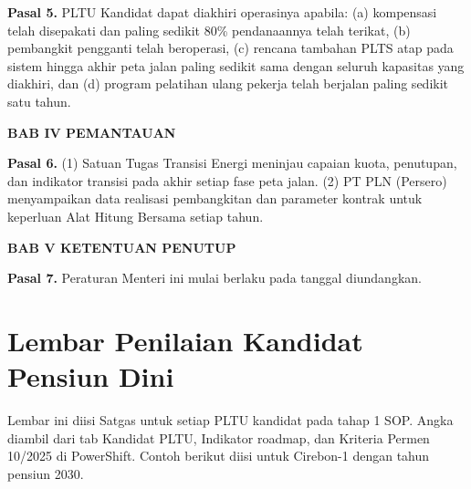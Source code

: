 \noindent\textbf{Pasal 5.} PLTU Kandidat dapat diakhiri operasinya apabila: (a) kompensasi telah disepakati dan paling sedikit 80\% pendanaannya telah terikat, (b) pembangkit pengganti telah beroperasi, (c) rencana tambahan PLTS atap pada sistem hingga akhir peta jalan paling sedikit sama dengan seluruh kapasitas yang diakhiri, dan (d) program pelatihan ulang pekerja telah berjalan paling sedikit satu tahun.

\begin{center}\textbf{BAB IV PEMANTAUAN}\end{center}
\noindent\textbf{Pasal 6.} (1) Satuan Tugas Transisi Energi meninjau capaian kuota, penutupan, dan indikator transisi pada akhir setiap fase peta jalan. (2) PT PLN (Persero) menyampaikan data realisasi pembangkitan dan parameter kontrak untuk keperluan Alat Hitung Bersama setiap tahun.

\begin{center}\textbf{BAB V KETENTUAN PENUTUP}\end{center}
\noindent\textbf{Pasal 7.} Peraturan Menteri ini mulai berlaku pada tanggal diundangkan.

\section{Lembar Penilaian Kandidat Pensiun Dini}
\label{lamp:lembar}

Lembar ini diisi Satgas untuk setiap PLTU kandidat pada tahap 1 SOP. Angka diambil dari tab Kandidat PLTU, Indikator roadmap, dan Kriteria Permen 10/2025 di PowerShift. Contoh berikut diisi untuk Cirebon-1 dengan tahun pensiun 2030.

